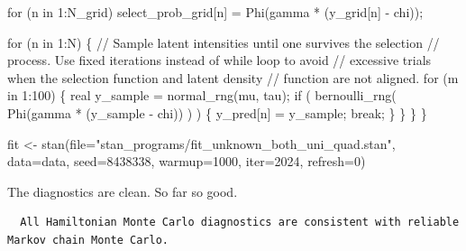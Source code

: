 \documentclass[
  letterpaper,
  DIV=11,
  numbers=noendperiod]{scrartcl}
\newenvironment{Shaded}{\begin{snugshade}}{\end{snugshade}}
\newcommand{\AttributeTok}[1]{\textcolor[rgb]{0.40,0.45,0.13}{#1}}
\newcommand{\CommentTok}[1]{\textcolor[rgb]{0.37,0.37,0.37}{#1}}
\newcommand{\ControlFlowTok}[1]{\textcolor[rgb]{0.00,0.23,0.31}{#1}}
\newcommand{\DataTypeTok}[1]{\textcolor[rgb]{0.68,0.00,0.00}{#1}}
\newcommand{\DecValTok}[1]{\textcolor[rgb]{0.68,0.00,0.00}{#1}}
\newcommand{\FunctionTok}[1]{\textcolor[rgb]{0.28,0.35,0.67}{#1}}
\newcommand{\NormalTok}[1]{\textcolor[rgb]{0.00,0.23,0.31}{#1}}
\newcommand{\OtherTok}[1]{\textcolor[rgb]{0.00,0.23,0.31}{#1}}
\newcommand{\SpecialCharTok}[1]{\textcolor[rgb]{0.37,0.37,0.37}{#1}}
\newcommand{\StringTok}[1]{\textcolor[rgb]{0.13,0.47,0.30}{#1}}
\begin{document}
\begin{codelisting}
\begin{Shaded}
\begin{Highlighting}[]
  \ControlFlowTok{for}\NormalTok{ (n }\ControlFlowTok{in} \DecValTok{1}\NormalTok{:N\_grid)}
\NormalTok{    select\_prob\_grid[n] = Phi(gamma * (y\_grid[n] {-} chi));}
  
  \ControlFlowTok{for}\NormalTok{ (n }\ControlFlowTok{in} \DecValTok{1}\NormalTok{:N) \{}
    \CommentTok{// Sample latent intensities until one survives the selection}
    \CommentTok{// process.  Use fixed iterations instead of while loop to avoid }
    \CommentTok{// excessive trials when the selection function and latent density }
    \CommentTok{// function are not aligned.}
    \ControlFlowTok{for}\NormalTok{ (m }\ControlFlowTok{in} \DecValTok{1}\NormalTok{:}\DecValTok{100}\NormalTok{) \{}
      \DataTypeTok{real}\NormalTok{ y\_sample = normal\_rng(mu, tau);}
      \ControlFlowTok{if}\NormalTok{ ( bernoulli\_rng( Phi(gamma * (y\_sample {-} chi)) ) ) \{}
\NormalTok{        y\_pred[n] = y\_sample;}
        \ControlFlowTok{break}\NormalTok{;}
\NormalTok{      \}}
\NormalTok{    \}}
\NormalTok{  \}}
\NormalTok{\}}
\end{Highlighting}
\end{Shaded}

\end{codelisting}

\begin{Shaded}
\begin{Highlighting}[]
\NormalTok{fit }\OtherTok{\textless{}{-}} \FunctionTok{stan}\NormalTok{(}\AttributeTok{file=}\StringTok{"stan\_programs/fit\_unknown\_both\_uni\_quad.stan"}\NormalTok{,}
            \AttributeTok{data=}\NormalTok{data, }\AttributeTok{seed=}\DecValTok{8438338}\NormalTok{,}
            \AttributeTok{warmup=}\DecValTok{1000}\NormalTok{, }\AttributeTok{iter=}\DecValTok{2024}\NormalTok{, }\AttributeTok{refresh=}\DecValTok{0}\NormalTok{)}
\end{Highlighting}
\end{Shaded}

The diagnostics are clean. So far so good.

\begin{Shaded}
\end{Shaded}

\begin{verbatim}
  All Hamiltonian Monte Carlo diagnostics are consistent with reliable
Markov chain Monte Carlo.
\end{verbatim}
\end{document}
